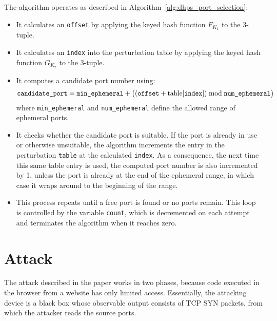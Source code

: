 \documentclass{report}
\begin{document}
The algorithm operates as described in Algorithm~\ref{alg:dhps_port_selection}:
\begin{itemize}
    \item It calculates an \texttt{offset} by applying the keyed hash function \( F_{K_1} \) to the 3-tuple.
    \item It calculates an \texttt{index} into the perturbation table by applying the keyed hash function \( G_{K_2} \) to the 3-tuple.
    \item It computes a candidate port number using:
    \[
      \texttt{candidate\_port} = \texttt{min\_ephemeral} + \bigl((\texttt{offset} + \text{table[\texttt{index}]}) \bmod \texttt{num\_ephemeral}\bigr)
    \]
    where \texttt{min\_ephemeral} and \texttt{num\_ephemeral} define the allowed range of ephemeral ports.
    \item It checks whether the candidate port is suitable. If the port is already in use or otherwise unsuitable, the algorithm increments the entry in the perturbation \texttt{table} at the calculated \texttt{index}. As a consequence, the next time this same table entry is used, the computed port number is also incremented by 1, unless the port is already at the end of the ephemeral range, in which case it wraps around to the beginning of the range.
    \item This process repeats until a free port is found or no ports remain. This loop is controlled by the variable \texttt{count}, which is decremented on each attempt and terminates the algorithm when it reaches zero.
\end{itemize}

\begin{center}
		\begin{minipage}[t]{0.5\textwidth}
			\vspace{0cm}

			
		\end{minipage}
\end{center}


\vspace{0.5cm}
\chapter{Attack}
\label{sec:attack}

The attack described in the paper works in two phases, because code executed in the browser from a website has only limited access. Essentially, the attacking device is a black box whose observable output consists of TCP SYN packets, from which the attacker reads the source ports.
\end{document}
